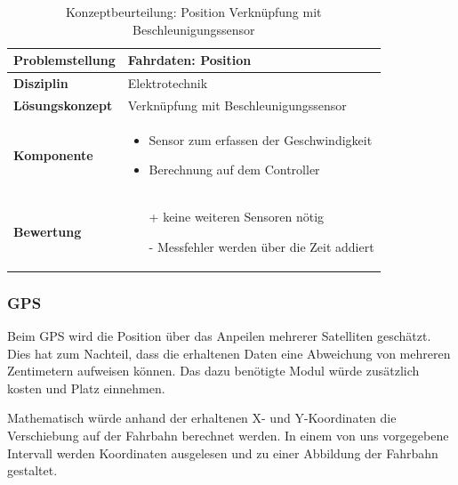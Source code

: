 \documentclass[../../main.tex]{subfiles}
\begin{document}
    \begin{flushleft}
        \begin{table}[H]
        \begin{tabular}{ | l | p{11cm} |}
        \hline
        \textbf{Problemstellung} & Fahrdaten: Position \\ \hline
        \textbf{Disziplin} & Elektrotechnik \\ \hline
        \textbf{Lösungskonzept} & Verknüpfung mit Beschleunigungssensor\\ \hline
        \textbf{Komponente} & \begin{itemize}
            \item Sensor zum erfassen der Geschwindigkeit
            \item Berechnung auf dem Controller
            \end{itemize}\\ \hline
        \textbf{Bewertung} &  \begin{itemize}
                                \item[+] keine weiteren Sensoren nötig
                                \item[-] Messfehler werden über die Zeit addiert
                              \end{itemize} \\ \hline
        \end{tabular}
        \caption{Konzeptbeurteilung: Position Verknüpfung mit Beschleunigungssensor}
        \label{tab:fahr_pos_Beschleunigung}
    \end{table}
    \end{flushleft}

    \subsubsection{GPS}
    Beim GPS wird die Position über das Anpeilen mehrerer Satelliten geschätzt.
    Dies hat zum Nachteil, dass die erhaltenen Daten eine Abweichung von mehreren Zentimetern aufweisen können.
    Das dazu benötigte Modul würde zusätzlich kosten und Platz einnehmen.

    Mathematisch würde anhand der erhaltenen X- und Y-Koordinaten die Verschiebung auf der Fahrbahn berechnet werden.
    In einem von uns vorgegebene Intervall werden Koordinaten ausgelesen und zu einer Abbildung der Fahrbahn gestaltet.
\end{document}
